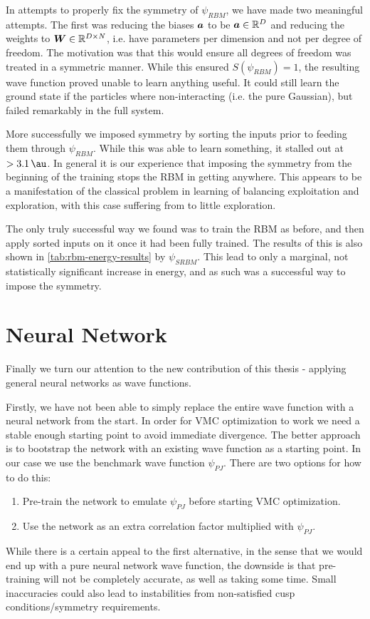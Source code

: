 \documentclass[Thesis.tex]{subfiles}
\begin{document}
In attempts to properly fix the symmetry of $\psi_{RBM}$, we have made two meaningful
attempts. The first was reducing the biases $\bm{a}$ to be $\bm{a}\in\mathbb{R}^D$
and reducing the weights to
$\bm{W}\in\mathbb{R}^{D\times N}$, i.e. have parameters per dimension and not
per degree of freedom. The motivation was that this would ensure all
degrees of freedom was treated in a symmetric manner. While this ensured
$S(\psi_{RBM})=1$, the resulting wave function proved unable to learn anything
useful. It could still learn the ground state if the particles where
non-interacting (i.e. the pure Gaussian), but failed remarkably in the full
system.

More successfully we imposed symmetry by sorting the inputs prior to feeding
them through $\psi_{RBM}$. While this was able to learn something, it stalled
out at $>\SI{3.1}{\au}$. In general it is our experience that imposing the
symmetry from the beginning of the training stops the RBM in getting anywhere.
This appears to be a manifestation of the classical problem in learning of balancing
exploitation and exploration, with this case suffering from to little
exploration.

The only truly successful way we found was to train the RBM as before, and then
apply sorted inputs on it once it had been fully trained. The results of this is
also shown in \cref{tab:rbm-energy-results} by $\psi_{SRBM}$. This lead to only a
marginal, not statistically significant increase in energy, and as such was a
successful way to impose the symmetry.

\section{Neural Network}

Finally we turn our attention to the new contribution of this thesis - applying
general neural networks as wave functions.

Firstly, we have not been able to simply replace the entire wave function with a
neural network from the start. In order for VMC optimization to work we need a
stable enough starting point to avoid immediate divergence. The better approach
is to bootstrap the network with an existing wave function as a starting point.
In our case we use the benchmark wave function $\psi_{PJ}$. There are two
options for how to do this:

\begin{enumerate}
\item Pre-train the network to emulate $\psi_{PJ}$ before starting VMC
  optimization.
\item Use the network as an extra correlation factor multiplied with $\psi_{PJ}$.
\end{enumerate}
While there is a certain appeal to the first alternative, in the
sense that we would end up with a pure neural network wave function, the
downside is that pre-training will not be completely accurate, as well as taking
some time. Small inaccuracies could also lead to instabilities from non-satisfied
cusp conditions/symmetry requirements.
\end{document}
